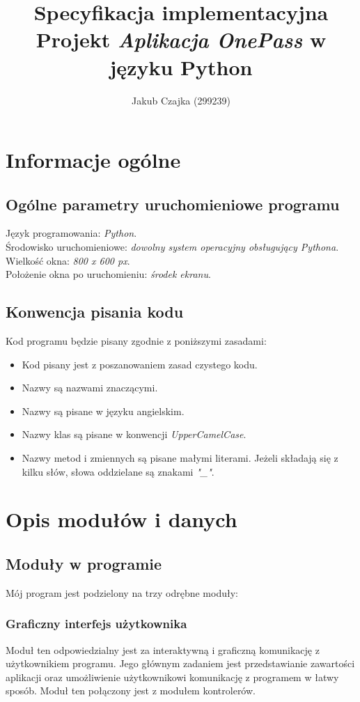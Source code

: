 \documentclass[a4paper]{article}
\title{Specyfikacja implementacyjna \\ Projekt \textit{Aplikacja OnePass} w języku Python}
\author{Jakub Czajka (299239)}
\begin{document}
\maketitle
\thispagestyle{empty}
\tableofcontents

\newpage

\section{Informacje ogólne}
\subsection{Ogólne parametry uruchomieniowe programu}
Język programowania: \textit{Python}.\medskip\\
Środowisko uruchomieniowe: \textit{dowolny system operacyjny obsługujący Pythona}.\medskip\\
Wielkość okna: \textit{800 x 600 px}.\medskip\\
Położenie okna po uruchomieniu: \textit{środek ekranu}.

\subsection{Konwencja pisania kodu}
Kod programu będzie pisany zgodnie z poniższymi zasadami:
\begin{itemize}
    \item Kod pisany jest z poszanowaniem zasad czystego kodu.
    \item Nazwy są nazwami znaczącymi.
    \item Nazwy są pisane w języku angielskim.
    \item Nazwy klas są pisane w konwencji \textit{UpperCamelCase}.
    \item Nazwy metod i zmiennych są pisane małymi literami. Jeżeli składają się z kilku słów, słowa oddzielane są znakami \textit{"\_"}.
\end{itemize}

\section{Opis modułów i danych}
\subsection{Moduły w programie}
Mój program jest podzielony na trzy odrębne moduły:

\subsubsection{Graficzny interfejs użytkownika}
Moduł ten odpowiedzialny jest za interaktywną i graficzną komunikację z użytkownikiem programu. Jego głównym zadaniem jest przedstawianie zawartości aplikacji oraz umożliwienie użytkownikowi komunikację z programem w łatwy sposób. Moduł ten połączony jest z modułem kontrolerów.
\end{document}
